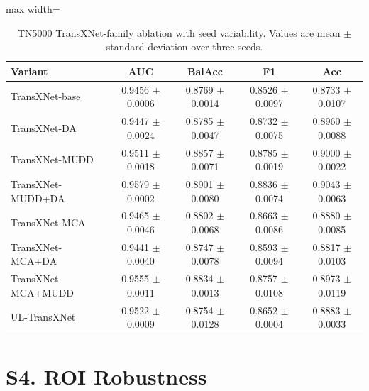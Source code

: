\documentclass[preprint,12pt]{elsarticle}
\newcommand{\suppsection}[1]{\Needspace{0.35\textheight}\section*{#1}}
\begin{document}
\begin{table}[H]
    \centering
    \small
    \caption{TN5000 TransXNet-family ablation with seed variability. Values are mean $\pm$ standard deviation over three seeds.}
    \label{tab:s_factorial_detail}
    \begin{adjustbox}{max width=\columnwidth}
    \begin{tabular}{lcccc}
        \toprule
        Variant & AUC & BalAcc & F1 & Acc \\
        \midrule
        TransXNet-base & 0.9456 $\pm$ 0.0006 & 0.8769 $\pm$ 0.0014 & 0.8526 $\pm$ 0.0097 & 0.8733 $\pm$ 0.0107 \\
        TransXNet-DA & 0.9447 $\pm$ 0.0024 & 0.8785 $\pm$ 0.0047 & 0.8732 $\pm$ 0.0075 & 0.8960 $\pm$ 0.0088 \\
        TransXNet-MUDD & 0.9511 $\pm$ 0.0018 & 0.8857 $\pm$ 0.0071 & 0.8785 $\pm$ 0.0019 & 0.9000 $\pm$ 0.0022 \\
        TransXNet-MUDD+DA & 0.9579 $\pm$ 0.0002 & 0.8901 $\pm$ 0.0080 & 0.8836 $\pm$ 0.0074 & 0.9043 $\pm$ 0.0063 \\
        TransXNet-MCA & 0.9465 $\pm$ 0.0046 & 0.8802 $\pm$ 0.0068 & 0.8663 $\pm$ 0.0086 & 0.8880 $\pm$ 0.0085 \\
        TransXNet-MCA+DA & 0.9441 $\pm$ 0.0040 & 0.8747 $\pm$ 0.0078 & 0.8593 $\pm$ 0.0094 & 0.8817 $\pm$ 0.0103 \\
        TransXNet-MCA+MUDD & 0.9555 $\pm$ 0.0011 & 0.8834 $\pm$ 0.0013 & 0.8757 $\pm$ 0.0108 & 0.8973 $\pm$ 0.0119 \\
        UL-TransXNet & 0.9522 $\pm$ 0.0009 & 0.8754 $\pm$ 0.0128 & 0.8652 $\pm$ 0.0004 & 0.8883 $\pm$ 0.0033 \\
        \bottomrule
    \end{tabular}
    \end{adjustbox}
\end{table}

\suppsection{S4. ROI Robustness}
\end{document}
